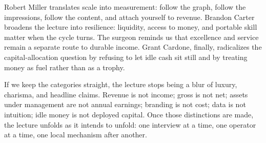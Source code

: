Robert Miller translates scale into measurement: follow the graph, follow the impressions, follow the content, and attach yourself to revenue. Brandon Carter broadens the lecture into resilience: liquidity, access to money, and portable skill matter when the cycle turns. The surgeon reminds us that excellence and service remain a separate route to durable income. Grant Cardone, finally, radicalizes the capital-allocation question by refusing to let idle cash sit still and by treating money as fuel rather than as a trophy.

If we keep the categories straight, the lecture stops being a blur of luxury, charisma, and headline claims. Revenue is not income; gross is not net; assets under management are not annual earnings; branding is not cost; data is not intuition; idle money is not deployed capital. Once those distinctions are made, the lecture unfolds as it intends to unfold: one interview at a time, one operator at a time, one local mechanism after another.